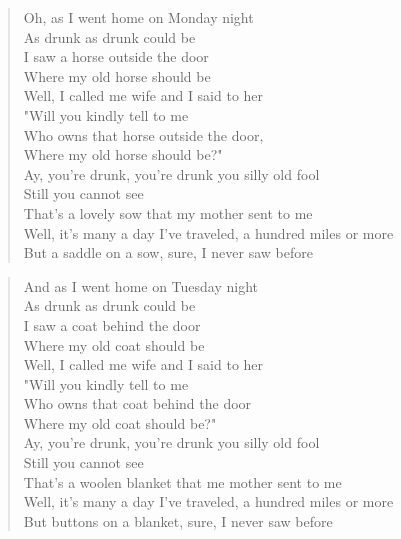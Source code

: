\documentclass[8pt,twoside]{extarticle}
\newenvironment{xverse}{
	\interlinepenalty 10000
	\begin{verse}
	\begin{minipage}{\linewidth}
	\parskip 5pt
	\vspace{-6pt}
	}
	{
	\end{minipage}
	\end{verse}
	\penalty 0
	\vspace{-6pt}
	}
\begin{document}
\begin{xverse}
Oh, as I went home on Monday night \\
As drunk as drunk could be \\
I saw a horse outside the door \\
Where my old horse should be \\
Well, I called me wife and I said to her \\
"Will you kindly tell to me \\
Who owns that horse outside the door, \\
Where my old horse should be?" \\
Ay, you're drunk, you're drunk you silly old fool \\
Still you cannot see \\
That's a lovely sow that my mother sent to me \\
Well, it's many a day I've traveled, a hundred miles or more \\
But a saddle on a sow, sure, I never saw before \\
\end{xverse}

\begin{xverse}
And as I went home on Tuesday night \\
As drunk as drunk could be \\
I saw a coat behind the door \\
Where my old coat should be \\
Well, I called me wife and I said to her \\
"Will you kindly tell to me \\
Who owns that coat behind the door \\
Where my old coat should be?" \\
Ay, you're drunk, you're drunk you silly old fool \\
Still you cannot see \\
That's a woolen blanket that me mother sent to me \\
Well, it's many a day I've traveled, a hundred miles or more \\
But buttons on a blanket, sure, I never saw before \\
\end{xverse}
\end{document}
